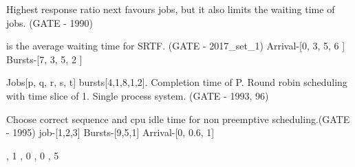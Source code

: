 \vspace{0.08in}



\begin{minipage}{\linewidth}


  \question Highest response ratio next favours   jobs, but it also limits the
            waiting time of  jobs. (GATE - 1990)

  \end{minipage}

\vspace{0.08in}



\begin{minipage}{\linewidth}

  \question \fillin[.........] is the average waiting time for SRTF. (GATE - 2017\_set\_1) \newline
            [P1, P2, P3, P4]
            Arrival-[0,  3,  5,  6 ]
            Bursts-[7,  3,  5,  2 ]

  \end{minipage}

\vspace{0.08in}



\begin{minipage}{\linewidth}

  \question Jobs[p, q, r, s, t] bursts[4,1,8,1,2]. Completion time of P. Round robin scheduling with time slice of 1.
            Single process system. (GATE - 1993, 96)

  \begin{choices}
  \end{choices}


  \end{minipage}

\vspace{0.08in}



\begin{minipage}{\linewidth}

  \question  Choose correct sequence and cpu idle time for non preemptive scheduling.(GATE - 1995)
             \newline job-[1,2,3] Bursts-[9,5,1] Arrival-[0, 0.6, 1]
  \begin{choices}
    , 1
    , 0
    , 0
    , 5
  \end{choices}

  \end{minipage}

